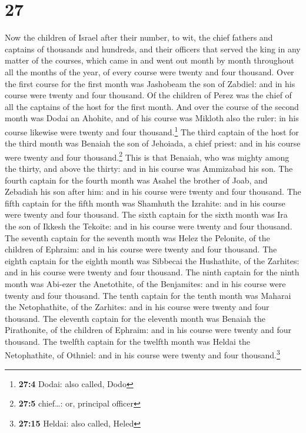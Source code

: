 \hypertarget{section-26}{%
\section{27}\label{section-26}}

 Now the children of Israel after their number, to wit,
the chief fathers and captains of thousands and hundreds, and their
officers that served the king in any matter of the courses, which came
in and went out month by month throughout all the months of the year, of
every course were twenty and four thousand.  Over the
first course for the first month was Jashobeam the son of Zabdiel: and
in his course were twenty and four thousand.  Of the
children of Perez was the chief of all the captains of the host for the
first month.  And over the course of the second month was
Dodai an Ahohite, and of his course was Mikloth also the ruler: in his
course likewise were twenty and four thousand.\footnote{\textbf{27:4}
  Dodai: also called, Dodo}  The third captain of the host
for the third month was Benaiah the son of Jehoiada, a chief priest: and
in his course were twenty and four thousand.\footnote{\textbf{27:5}
  chief\ldots: or, principal officer}  This is that
Benaiah, who was mighty among the thirty, and above the thirty: and in
his course was Ammizabad his son.  The fourth captain for
the fourth month was Asahel the brother of Joab, and Zebadiah his son
after him: and in his course were twenty and four thousand.
 The fifth captain for the fifth month was Shamhuth the
Izrahite: and in his course were twenty and four thousand.
 The sixth captain for the sixth month was Ira the son of
Ikkesh the Tekoite: and in his course were twenty and four thousand.
 The seventh captain for the seventh month was Helez the
Pelonite, of the children of Ephraim: and in his course were twenty and
four thousand.  The eighth captain for the eighth month
was Sibbecai the Hushathite, of the Zarhites: and in his course were
twenty and four thousand.  The ninth captain for the
ninth month was Abi-ezer the Anetothite, of the Benjamites: and in his
course were twenty and four thousand.  The tenth captain
for the tenth month was Maharai the Netophathite, of the Zarhites: and
in his course were twenty and four thousand.  The
eleventh captain for the eleventh month was Benaiah the Pirathonite, of
the children of Ephraim: and in his course were twenty and four
thousand.  The twelfth captain for the twelfth month was
Heldai the Netophathite, of Othniel: and in his course were twenty and
four thousand.\footnote{\textbf{27:15} Heldai: also called, Heled}

